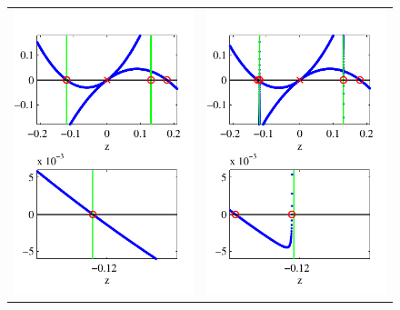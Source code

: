 \documentclass[review,onefignum,onetabnum]{siamart171218}
\begin{document}
\begin{figure}[ht]%
\begin{center}
\begin{tabular}{cc}
\includegraphics{KreinEvalK000MuCollide} &
\includegraphics{KreinEvalK005MuCollide}

\end{tabular}
\end{center}
\end{figure}
\end{document}
